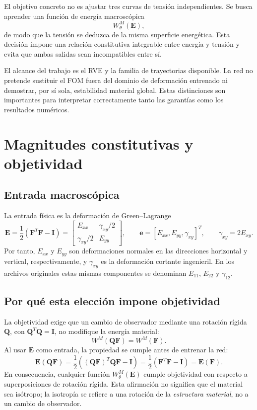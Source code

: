 \documentclass[11pt,a4paper]{article}
\newcommand{\E}{\ensuremath{\bm E}}
\newcommand{\F}{\ensuremath{\bm F}}
\newcommand{\evec}{\ensuremath{\bm e}}
\newcommand{\W}{\ensuremath{W}}
\newcommand{\FOM}{\textsc{FOM}}
\begin{document}
El objetivo concreto no es ajustar tres curvas de tensión independientes. Se
busca aprender una función de energía macroscópica
\[
  \W_\theta^M(\E),
\]
de modo que la tensión se deduzca de la misma superficie energética. Esta
decisión impone una relación constitutiva integrable entre energía y tensión y
evita que ambas salidas sean incompatibles entre sí.

El alcance del trabajo es el RVE y la familia de trayectorias disponible. La
red no pretende sustituir el \FOM{} fuera del dominio de deformación entrenado
ni demostrar, por sí sola, estabilidad material global. Estas distinciones son
importantes para interpretar correctamente tanto las garantías como los
resultados numéricos.

\section{Magnitudes constitutivas y objetividad}

\subsection{Entrada macroscópica}

La entrada física es la deformación de Green--Lagrange
\[
 \E=\frac12(\F^T\F-\bm I)
 =\begin{bmatrix}
 E_{xx} & \gamma_{xy}/2\\
 \gamma_{xy}/2 & E_{yy}
 \end{bmatrix},
 \qquad
 \evec=[E_{xx},E_{yy},\gamma_{xy}]^T,
 \qquad
 \gamma_{xy}=2E_{xy}.
\]
Por tanto, \(E_{xx}\) y \(E_{yy}\) son deformaciones normales en las
direcciones horizontal y vertical, respectivamente, y \(\gamma_{xy}\) es la
deformación cortante ingenieril. En los archivos originales estas mismas
componentes se denominan \(E_{11}\), \(E_{22}\) y \(\gamma_{12}\).

\subsection{Por qué esta elección impone objetividad}

La objetividad exige que un cambio de observador mediante una rotación rígida
\(\bm Q\), con \(\bm Q^T\bm Q=\bm I\), no modifique la energía material:
\[
 \W^M(\bm Q\F)=\W^M(\F).
\]
Al usar \(\E\) como entrada, la propiedad se cumple antes de entrenar la red:
\[
 \E(\bm Q\F)
 =\frac12\left((\bm Q\F)^T\bm Q\F-\bm I\right)
 =\frac12\left(\F^T\F-\bm I\right)
 =\E(\F).
\]
En consecuencia, cualquier función \(\W_\theta^M(\E)\) cumple objetividad con
respecto a superposiciones de rotación rígida. Esta afirmación no significa que
el material sea isótropo; la isotropía se refiere a una rotación de la
\emph{estructura material}, no a un cambio de observador.
\end{document}
